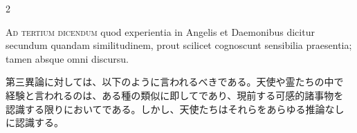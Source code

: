 \documentclass[paper=a4paper,fontsize=10pt,jafontsize=9pt,titlepage]{jlreq}
\begin{document}
\begin{paracol}{2}
\switchcolumn*

{\scshape Ad tertium dicendum} quod experientia in
Angelis et Daemonibus dicitur secundum quandam similitudinem, prout
scilicet cognoscunt sensibilia praesentia; tamen absque omni discursu.

\switchcolumn

第三異論に対しては、以下のように言われるべきである。天使や霊たちの中で
経験と言われるのは、ある種の類似に即してであり、現前する可感的諸事物を
認識する限りにおいてである。しかし、天使たちはそれらをあらゆる推論なし
に認識する。

\switchcolumn*

\end{paracol}
\end{document}
